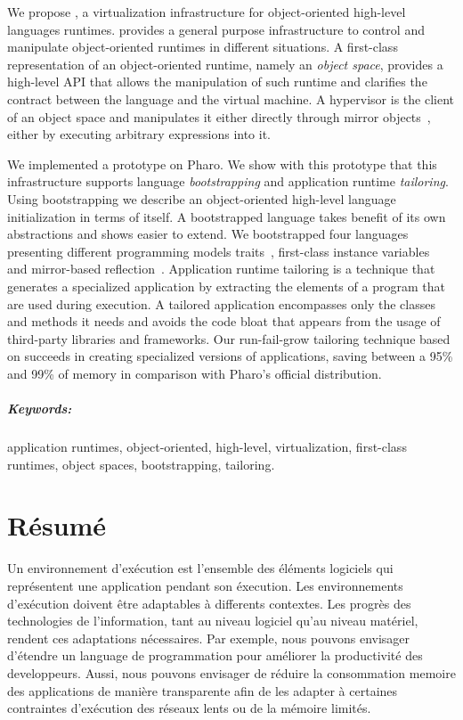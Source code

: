 \documentclass[a4paper,11pt,twoside]{include/ThesisStyle}
\begin{document}
We propose \Vtt, a virtualization infrastructure for object-oriented high-level languages runtimes. \Vtt provides a general purpose infrastructure to control and manipulate object-oriented runtimes in different situations. A first-class representation of an object-oriented runtime, namely an \emph{object space}, provides a high-level API that allows the manipulation of such runtime and clarifies the contract between the language and the virtual machine. A hypervisor is the client of an object space and manipulates it either directly through mirror objects~\cite{Brac04b}, either by executing arbitrary expressions into it.

We implemented a \Vtt prototype on Pharo. We show with this prototype that this infrastructure supports language \emph{bootstrapping} and application runtime \emph{tailoring}. Using bootstrapping we describe an object-oriented high-level language initialization in terms of itself. A bootstrapped language takes benefit of its own abstractions and shows easier to extend. We bootstrapped four languages presenting different programming models \eg traits~\cite{Scha03a}, first-class instance variables~\cite{Verw11a} and mirror-based reflection~\cite{Brac04b}.  Application runtime tailoring is a technique that generates a specialized application by extracting the elements of a program that are used during execution. A tailored application encompasses only the classes and methods it needs and avoids the code bloat that appears from the usage of third-party libraries and frameworks. Our run-fail-grow tailoring technique based on \Vtt succeeds in creating specialized versions of applications, saving between a 95\% and 99\% of memory in comparison with Pharo's official distribution.

\paragraph{Keywords:} application runtimes, object-oriented, high-level, virtualization, first-class runtimes, object spaces, bootstrapping, tailoring.

\chapter*{Résumé}

Un environnement d'exécution est l'ensemble des éléments logiciels qui représentent une application pendant son éxecution. Les environnements d'exécution doivent être adaptables à differents contextes. Les progrès des technologies de l'information, tant au niveau logiciel qu'au niveau matériel, rendent ces adaptations nécessaires. Par exemple, nous pouvons envisager d'étendre un language de programmation pour améliorer la productivité des developpeurs. Aussi, nous pouvons envisager de réduire la consommation memoire des applications de manière transparente afin de les adapter à certaines contraintes d'exécution \eg des réseaux lents ou de la mémoire limités.
\end{document}
